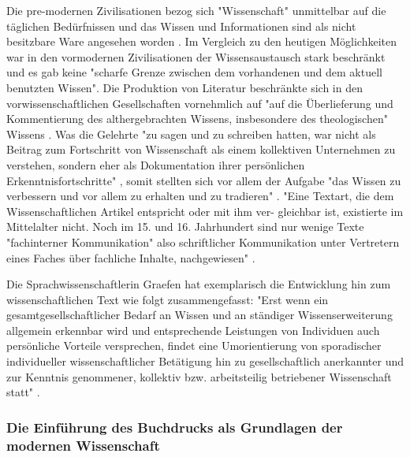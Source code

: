 Die pre-modernen Zivilisationen bezog sich "Wissenschaft" unmittelbar auf die täglichen Bedürfnissen und das Wissen und Informationen sind als nicht besitzbare Ware angesehen worden\cite{cite:18} \cite{steiner_1998_autorenhonorar}. Im Vergleich zu den heutigen Möglichkeiten war in den vormodernen Zivilisationen der Wissensaustausch stark beschränkt \cite{cite:17c} und es gab keine "scharfe Grenze zwischen dem vorhandenen und dem aktuell benutzten Wissen"\cite{Luhmann1998}. Die Produktion von Literatur beschränkte sich in den vorwissenschaftlichen Gesellschaften vornehmlich auf "auf die Überlieferung und Kommentierung des althergebrachten Wissens, insbesondere des theologischen" Wissens \cite{steiner_1998_autorenhonorar}. Was die Gelehrte "zu sagen und zu schreiben hatten, war nicht als Beitrag zum Fortschritt von Wissenschaft als einem kollektiven Unternehmen zu verstehen, sondern eher als Dokumentation ihrer persönlichen Erkenntnisfortschritte" \cite{graefen2007_wissenschaftliche_artikel}, somit stellten sich vor allem der Aufgabe "das Wissen zu verbessern und vor allem zu erhalten und zu tradieren" \cite{Luhmann1998}. "Eine Textart, die dem Wissenschaftlichen Artikel entspricht oder mit ihm ver- gleichbar ist, existierte im Mittelalter nicht. Noch im 15. und 16. Jahrhundert sind nur wenige Texte "fachinterner Kommunikation" also schriftlicher Kommunikation unter Vertretern eines Faches über fachliche Inhalte, nachgewiesen" \cite{graefen2007_wissenschaftliche_artikel}.

Die Sprachwissenschaftlerin Graefen hat exemplarisch die Entwicklung hin zum wissenschaftlichen Text wie folgt zusammengefasst: "Erst wenn ein gesamtgesellschaftlicher Bedarf an Wissen und an ständiger Wissenserweiterung allgemein erkennbar wird und entsprechende Leistungen von Individuen auch persönliche Vorteile versprechen, findet eine Umorientierung von sporadischer individueller wissenschaftlicher Betätigung hin zu gesellschaftlich anerkannter und zur Kenntnis genommener, kollektiv bzw. arbeitsteilig betriebener Wissenschaft statt" \cite{graefen2007_wissenschaftliche_artikel}.

\subsubsection{Die Einführung des Buchdrucks als Grundlagen der modernen Wissenschaft}

